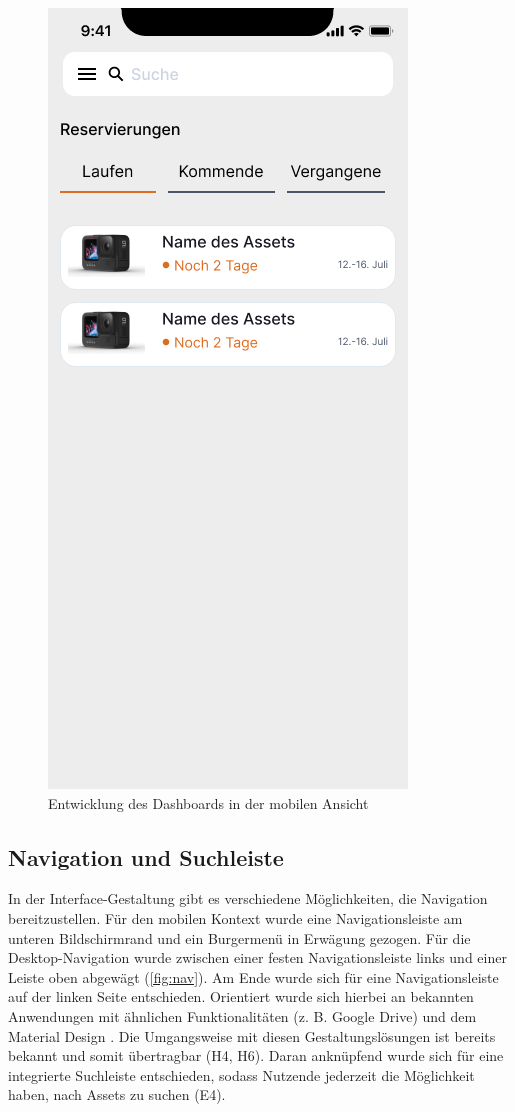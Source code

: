 \begin{figure}[h]
    \includegraphics[scale=0.3]{Bilder/Prototyp/Neu/V2.png}
    \caption{Entwicklung des Dashboards in der mobilen Ansicht}
    \label{fig:home}
\end{figure}

\subsection{Navigation und Suchleiste}
In der Interface-Gestaltung gibt es verschiedene Möglichkeiten, die Navigation
bereitzustellen. Für den mobilen Kontext wurde eine Navigationsleiste am unteren
Bildschirmrand und ein Burgermenü in Erwägung gezogen. Für die
Desktop-Navigation wurde zwischen einer festen Navigationsleiste links und einer
Leiste oben abgewägt (\ref{fig:nav}). Am Ende wurde sich für eine
Navigationsleiste auf der linken Seite entschieden. Orientiert wurde sich
hierbei an bekannten Anwendungen mit ähnlichen Funktionalitäten (z. B. Google
Drive) und dem Material Design \cite{google_material_2022}. Die Umgangsweise mit
diesen Gestaltungslösungen ist bereits bekannt und somit übertragbar (H4, H6).
Daran anknüpfend wurde sich für eine integrierte Suchleiste entschieden, sodass
Nutzende jederzeit die Möglichkeit haben, nach Assets zu suchen
\cite{google_material_2022} (E4).


